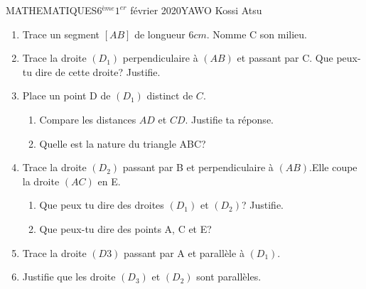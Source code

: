 \documentclass[12pt,a4paper]{book}
\newcommand{\prof}{YAWO Kossi Atsu}
\newcommand{\matiere}{MATHEMATIQUES}
\newcommand{\classe}{6$^{ème}$}
\begin{document}
\begin{td}{\matiere}{\classe}{$1^{er}$ février 2020}{\prof}
\begin{exo}
\begin{enumerate}
\item Trace un segment $[AB]$ de longueur $6cm$. Nomme C son milieu.
\item Trace la droite $(D_1)$ perpendiculaire à $(AB)$ et passant par C. Que peux-tu dire de cette droite? Justifie.
\item Place un point D de $(D_1)$ distinct de $C$.
\begin{enumerate}
\item Compare les distances $AD$ et $CD$. Justifie ta réponse.
\item Quelle est la nature du triangle ABC?
\end{enumerate}
\item Trace la droite $(D_2)$ passant par B et perpendiculaire à $(AB)$.Elle coupe la droite $(AC)$ en E.
\begin{enumerate}
\item Que peux tu dire des droites $(D_1)$ et $(D_2)$? Justifie.
\item Que peux-tu dire des points A, C et E?
\end{enumerate} 
\item Trace la droite $(D3)$ passant par A et parallèle à $(D_1)$.
\item Justifie que les droite $(D_3)$ et $(D_2)$ sont parallèles.
\end{enumerate} 
\end{exo}
\end{td}
\end{document}
